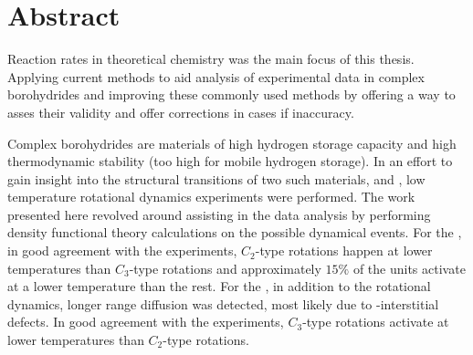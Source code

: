 \chapter*{Abstract}

Reaction rates in theoretical chemistry was the main focus of this thesis.
Applying current methods to aid analysis of experimental data in complex borohydrides and improving these commonly used methods by offering a way to asses their validity and offer corrections in cases if inaccuracy.

Complex borohydrides are materials of high hydrogen storage capacity and high thermodynamic stability (too high for mobile hydrogen storage).
In an effort to gain insight into the structural transitions of two such materials,  and , low temperature rotational dynamics experiments were performed.
The work presented here revolved around assisting in the data analysis by performing density functional theory calculations on the possible dynamical events.
For the , in good agreement with the experiments, $C_2$-type rotations happen at lower temperatures than $C_3$-type rotations and approximately $15\%$ of the  units activate at a lower temperature than the rest.
For the , in addition to the rotational dynamics, longer range diffusion was detected, most likely due to -interstitial defects.
In good agreement with the experiments, $C_3$-type rotations activate at lower temperatures than $C_2$-type rotations.

